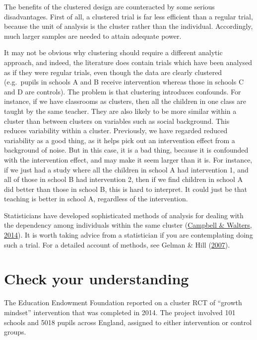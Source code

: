 \documentclass{krantz}
\begin{document}
The benefits of the clustered design are counteracted by some serious disadvantages. First of all, a clustered trial is far less efficient than a regular trial, because the unit of analysis is the cluster rather than the individual. Accordingly, much larger samples are needed to attain adequate power.

It may not be obvious why clustering should require a different analytic approach, and indeed, the literature does contain trials which have been analysed as if they were regular trials, even though the data are clearly clustered (e.g.~pupils in schools A and B receive intervention whereas those in schools C and D are controls). The problem is that clustering introduces confounds. For instance, if we have classrooms as clusters, then all the children in one class are taught by the same teacher. They are also likely to be more similar within a cluster than between clusters on variables such as social background. This reduces variability within a cluster. Previously, we have regarded reduced variability as a good thing, as it helps pick out an intervention effect from a background of noise. But in this case, it is a bad thing, because it is confounded with the intervention effect, and may make it seem larger than it is. For instance, if we just had a study where all the children in school A had intervention 1, and all of those in school B had intervention 2, then if we find children in school A did better than those in school B, this is hard to interpret. It could just be that teaching is better in school A, regardless of the intervention.

Statisticians have developed sophisticated methods of analysis for dealing with the dependency among individuals within the same cluster (\protect\hyperlink{ref-campbell2014}{Campbell \& Walters, 2014}). It is worth taking advice from a statistician if you are contemplating doing such a trial. For a detailed account of methods, see Gelman \& Hill (\protect\hyperlink{ref-gelman2007}{2007}).

\hypertarget{check-your-understanding-17}{%
\section{Check your understanding}\label{check-your-understanding-17}}

The Education Endowment Foundation reported on a cluster RCT of ``growth mindset'' intervention that was completed in 2014. The project involved 101 schools and 5018 pupils across England, assigned to either intervention or control groups.
\end{document}
